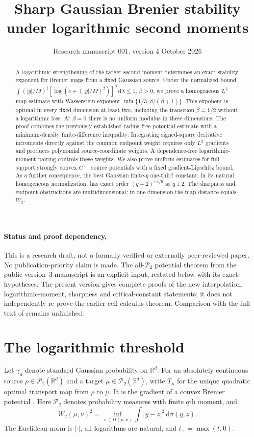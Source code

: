\documentclass[11pt]{article}
\title{Sharp Gaussian Brenier stability\\under logarithmic second moments}
\author{}\date{Research manuscript 001, version 4\quad 7 October 2026}
\numberwithin{equation}{section}
\theoremstyle{remark}\newtheorem{remark}[theorem]{Remark}
\newcommand{\R}{\mathbb R}\newcommand{\E}{\mathbb E}
\newcommand{\Prob}{\mathcal P}\newcommand{\dd}{\,\mathrm d}
\begin{document}
\maketitle\vspace{-1.5em}
\begin{abstract}
A logarithmic strengthening of the target second moment determines an exact stability exponent for Brenier maps from a fixed Gaussian source. Under the normalized bound $\int (|y|/M)^2[\log(e+(|y|/M)^2)]^\beta\dd\lambda\le1$, $\beta>0$, we prove a homogeneous $L^2$ map estimate with Wasserstein exponent $\min\{1/3,\beta/(\beta+1)\}$. This exponent is optimal in every fixed dimension at least two, including the transition $\beta=1/2$ without a logarithmic loss. At $\beta=0$ there is no uniform modulus in these dimensions. The proof combines the previously established radius-free potential estimate with a minimum-density finite-difference inequality. Integrating signed-square derivative increments directly against the common endpoint weight requires only $L^2$ gradients and produces polynomial source-coordinate weights. A dependence-free logarithmic-moment pairing controls these weights. We also prove uniform estimates for full-support strongly convex $C^{1,1}$ source potentials with a fixed gradient-Lipschitz bound. As a further consequence, the best Gaussian finite-$q$ one-third constant, in its natural homogeneous normalization, has exact order $(q-2)^{-1/6}$ as $q\downarrow2$. The sharpness and endpoint obstructions are multidimensional; in one dimension the map distance equals $W_2$.
\end{abstract}

\paragraph{Status and proof dependency.}
This is a research draft, not a formally verified or externally peer-reviewed paper. No publication-priority claim is made. The all-$\Prob_2$ potential theorem from the public version~3 manuscript \cite{ManuscriptV3} is an explicit input, restated below with its exact hypotheses. The present version gives complete proofs of the new interpolation, logarithmic-moment, sharpness and critical-constant statements; it does not independently re-prove the earlier cell-calculus theorem. Comparison with the full text of \cite{Merigot2026} remains unfinished.

\section{The logarithmic threshold}\label{sec:statements}
Let $\gamma_d$ denote standard Gaussian probability on $\R^d$. For an absolutely continuous source $\rho\in\Prob_2(\R^d)$ and a target $\mu\in\Prob_2(\R^d)$, write $T_\mu$ for the unique quadratic optimal transport map from $\rho$ to $\mu$. It is the gradient of a convex Brenier potential \cite{Brenier1991}. Here $\Prob_q$ denotes probability measures with finite $q$th moment, and
\[
 W_2(\mu,\nu)^2=\inf_{\pi\in\Pi(\mu,\nu)}\int|y-z|^2\dd\pi(y,z).
\]
The Euclidean norm is $|\cdot|$, all logarithms are natural, and $t_+=\max(t,0)$.
\end{document}
